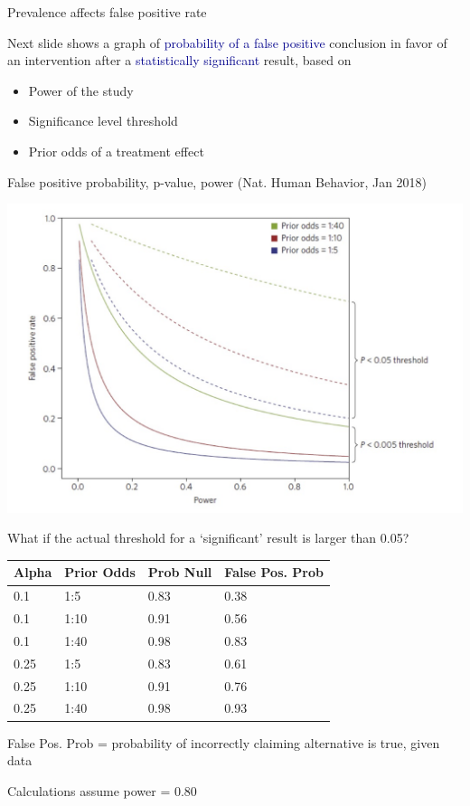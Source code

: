 \documentclass[ignorenonframetext,]{beamer}
\begin{document}
\begin{frame}{Prevalence affects false positive rate}
\protect\hypertarget{prevalence-affects-false-positive-rate}{}

Next slide shows a graph of
\textcolor{darkblue}{probability of a false positive} conclusion in
favor of an intervention after a
\textcolor{darkblue}{statistically significant} result, based on

\begin{itemize}
\item
  Power of the study
\item
  Significance level threshold
\item
  \textcolor{forest}{Prior odds of a treatment effect}
\end{itemize}

\end{frame}

\begin{frame}{False positive probability, p-value, power (Nat. Human
Behavior, Jan 2018)}
\protect\hypertarget{false-positive-probability-p-value-power-nat.-human-behavior-jan-2018}{}

\includegraphics[width=1\textwidth,height=\textheight]{../figures/ppv_threshold.jpeg}

\end{frame}

\begin{frame}{What if the actual threshold for a `significant' result is
larger than 0.05?}
\protect\hypertarget{what-if-the-actual-threshold-for-a-significant-result-is-larger-than-0.05}{}

\begin{longtable}[]{@{}llll@{}}
\toprule
Alpha & Prior Odds & Prob Null & False Pos. Prob\tabularnewline
\midrule
\endhead
0.1 & 1:5 & 0.83 & 0.38\tabularnewline
0.1 & 1:10 & 0.91 & 0.56\tabularnewline
0.1 & 1:40 & 0.98 & 0.83\tabularnewline
0.25 & 1:5 & 0.83 & 0.61\tabularnewline
0.25 & 1:10 & 0.91 & 0.76\tabularnewline
0.25 & 1:40 & 0.98 & 0.93\tabularnewline
\bottomrule
\end{longtable}

False Pos. Prob = probability of incorrectly claiming alternative is
true, given data

Calculations assume power = 0.80

\end{frame}
\end{document}
